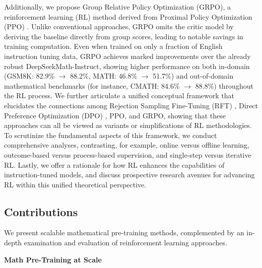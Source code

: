 Additionally, we propose Group Relative Policy Optimization (GRPO), a reinforcement learning (RL) method derived from Proximal Policy Optimization (PPO) \citep{schulman2017proximal}. Unlike conventional approaches, GRPO omits the critic model by deriving the baseline directly from group scores, leading to notable savings in training computation. Even when trained on only a fraction of English instruction tuning data, GRPO achieves marked improvements over the already robust DeepSeekMath-Instruct, showing higher performance on both in-domain (GSM8K: 82.9\% $\rightarrow$ 88.2\%, MATH: 46.8\% $\rightarrow$ 51.7\%) and out-of-domain mathematical benchmarks (for instance, CMATH: 84.6\% $\rightarrow$ 88.8\%) throughout the RL process. We further articulate a unified conceptual framework that elucidates the connections among Rejection Sampling Fine-Tuning (RFT) \citep{yuan2023scaling}, Direct Preference Optimization (DPO) \citep{dpo}, PPO, and GRPO, showing that these approaches can all be viewed as variants or simplifications of RL methodologies. To scrutinize the fundamental aspects of this framework, we conduct comprehensive analyses, contrasting, for example, online versus offline learning, outcome-based versus process-based supervision, and single-step versus iterative RL. Lastly, we offer a rationale for how RL enhances the capabilities of instruction-tuned models, and discuss prospective research avenues for advancing RL within this unified theoretical perspective.

\subsection{Contributions}
We present scalable mathematical pre-training methods, complemented by an in-depth examination and evaluation of reinforcement learning approaches.

\textbf{Math Pre-Training at Scale}

